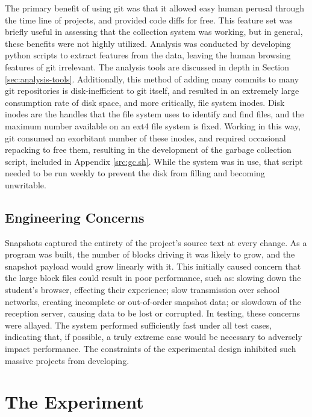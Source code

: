 The primary benefit of using git was that it allowed easy human perusal through the time line of projects, and provided code diffs for free. This feature set was briefly useful in assessing that the collection system was working, but in general, these benefits were not highly utilized. Analysis was conducted by developing python scripts to extract features from the data, leaving the human browsing features of git irrelevant. The analysis tools are discussed in depth in Section \ref{sec:analysis-tools}. Additionally, this method of adding many commits to many git repositories is disk-inefficient to git itself, and resulted in an extremely large consumption rate of disk space, and more critically, file system inodes. Disk inodes are the handles that the file system uses to identify and find files, and the maximum number available on an ext4 file system is fixed. Working in this way, git consumed an exorbitant number of these inodes, and required occasional repacking to free them, resulting in the development of the garbage collection script, included in Appendix \ref{src:gc.sh}. While the system was in use, that script needed to be run weekly to prevent the disk from filling and becoming unwritable. 

\subsection{Engineering Concerns}
Snapshots captured the entirety of the project's source text at every change. As a program was built, the number of blocks driving it was likely to grow, and the snapshot payload would grow linearly with it. This initially caused concern that the large block files could result in poor performance, such as: slowing down the student's browser, effecting their experience; slow transmission over school networks, creating incomplete or out-of-order snapshot data; or slowdown of the reception server, causing data to be lost or corrupted. In testing, these concerns were allayed. The system performed sufficiently fast under all test cases, indicating that, if possible, a truly extreme case would be necessary to adversely impact performance. The constraints of the experimental design inhibited such massive projects from developing.

\section{The Experiment}

